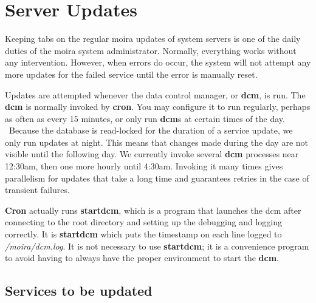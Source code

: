 \section{Server Updates}

Keeping tabs on the regular moira updates of system servers is one of
the daily duties of the moira system administrator.  Normally,
everything works without any intervention.  However, when errors do
occur, the system will not attempt any more updates for the failed
service until the error is manually reset.

Updates are attempted whenever the data control manager, or {\bf dcm},
is run.  The {\bf dcm} is normally invoked by {\bf cron}.  You may
configure it to run regularly, perhaps as often as every 15 minutes,
or only run {\bf dcm}s at certain times of the day.  \athena\ Because
the database is read-locked for the duration of a service update, we
only run updates at night.  This means that changes made during the
day are not visible until the following day.  We currently invoke
several {\bf dcm} processes near 12:30am, then one more hourly until
4:30am.  Invoking it many times gives parallelism for updates that
take a long time and guarantees retries in the case of transient
failures.

{\bf Cron} actually runs {\bf startdcm}, which is a
program that launches the dcm after connecting to the root directory
and setting up the debugging and logging correctly.  It is
{\bf startdcm} which puts the timestamp on each line logged to
{\em /moira/dcm.log}.  It is not necessary to use {\bf startdcm}; it is a
convenience program to avoid having to always have the proper
environment to start the {\bf dcm}.

\subsection{Services to be updated}

